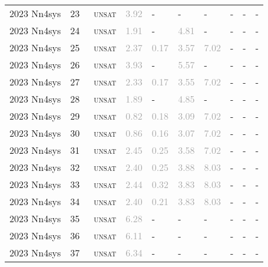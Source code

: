 \begin{center}
{\begin{longtable}{@{}llllllllll@{}}
2023 Nn4sys & 23 & ~\textsc{unsat} & \textcolor{darkgray}{3.92} & - & - & - & - & - & - \\
2023 Nn4sys & 24 & ~\textsc{unsat} & \textcolor{darkgray}{1.91} & - & \textcolor{darkgray}{4.81} & - & - & - & - \\
2023 Nn4sys & 25 & ~\textsc{unsat} & \textcolor{darkgray}{2.37} & \textcolor{darkgray}{0.17} & \textcolor{darkgray}{3.57} & \textcolor{darkgray}{7.02} & - & - & - \\
2023 Nn4sys & 26 & ~\textsc{unsat} & \textcolor{darkgray}{3.93} & - & \textcolor{darkgray}{5.57} & - & - & - & - \\
2023 Nn4sys & 27 & ~\textsc{unsat} & \textcolor{darkgray}{2.33} & \textcolor{darkgray}{0.17} & \textcolor{darkgray}{3.55} & \textcolor{darkgray}{7.02} & - & - & - \\
2023 Nn4sys & 28 & ~\textsc{unsat} & \textcolor{darkgray}{1.89} & - & \textcolor{darkgray}{4.85} & - & - & - & - \\
2023 Nn4sys & 29 & ~\textsc{unsat} & \textcolor{darkgray}{0.82} & \textcolor{darkgray}{0.18} & \textcolor{darkgray}{3.09} & \textcolor{darkgray}{7.02} & - & - & - \\
2023 Nn4sys & 30 & ~\textsc{unsat} & \textcolor{darkgray}{0.86} & \textcolor{darkgray}{0.16} & \textcolor{darkgray}{3.07} & \textcolor{darkgray}{7.02} & - & - & - \\
2023 Nn4sys & 31 & ~\textsc{unsat} & \textcolor{darkgray}{2.45} & \textcolor{darkgray}{0.25} & \textcolor{darkgray}{3.58} & \textcolor{darkgray}{7.02} & - & - & - \\
2023 Nn4sys & 32 & ~\textsc{unsat} & \textcolor{darkgray}{2.40} & \textcolor{darkgray}{0.25} & \textcolor{darkgray}{3.88} & \textcolor{darkgray}{8.03} & - & - & - \\
2023 Nn4sys & 33 & ~\textsc{unsat} & \textcolor{darkgray}{2.44} & \textcolor{darkgray}{0.32} & \textcolor{darkgray}{3.83} & \textcolor{darkgray}{8.03} & - & - & - \\
2023 Nn4sys & 34 & ~\textsc{unsat} & \textcolor{darkgray}{2.40} & \textcolor{darkgray}{0.21} & \textcolor{darkgray}{3.83} & \textcolor{darkgray}{8.03} & - & - & - \\
2023 Nn4sys & 35 & ~\textsc{unsat} & \textcolor{darkgray}{6.28} & - & - & - & - & - & - \\
2023 Nn4sys & 36 & ~\textsc{unsat} & \textcolor{darkgray}{6.11} & - & - & - & - & - & - \\
2023 Nn4sys & 37 & ~\textsc{unsat} & \textcolor{darkgray}{6.34} & - & - & - & - & - & - \\

\end{longtable}}
\end{center}
